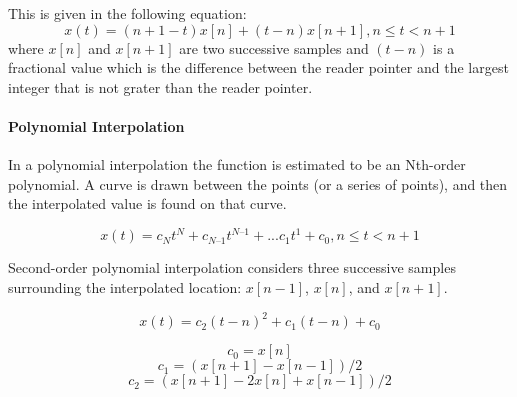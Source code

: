 This is given in the following equation:
\[
 x(t) = (n + 1 - t)x[n] + (t-n)x[n+1], 				n \leq t< n + 1
\]
where $x[n]$ and $x[n+1]$ are two successive  samples and $ (t-n) $ is a fractional value which is the difference between the reader pointer and the largest integer that is not grater than the reader pointer.

\paragraph{Polynomial Interpolation}
In a polynomial interpolation the function is estimated to be an Nth-order polynomial. A curve is drawn between the points (or a series of points), and then the interpolated value is found on that curve.~\cite{pirkle2013designing}

\[
 x(t) = c_{N}t^{N} + c_{N–1}t^{N–1} + ... c_{1}t^{1} + c_{0}, 				n \leq t< n + 1
 \]

Second-order polynomial interpolation considers three successive samples surrounding the interpolated location: $x[n-1]$, $x[n]$, and $x[n+1]$. 

\[
x(t) = c_{2}(t-n)^{2} + c_{1}(t-n) + c_{0}
\]

\[
c_{0} = x[n]
\]
\[
c_{1} = (x[n+1] - x[n-1])/2
\]
\[
c_{2} = (x[n+1] - 2x[n] + x[n-1])/2
\]



